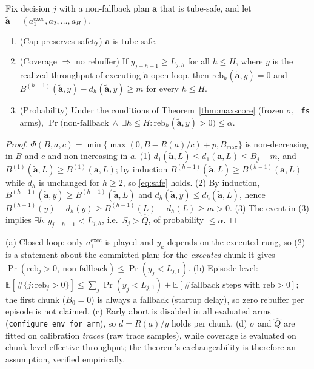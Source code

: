 \begin{lemma}\label{lem:safety}
Fix decision $j$ with a non-fallback plan $\mathbf a$ that is tube-safe, and let $\tilde{\mathbf a}=(a^{\mathrm{exec}}_1,a_2,\dots,a_H)$.
\begin{enumerate}
\item (Cap preserves safety) $\tilde{\mathbf a}$ is tube-safe.
\item (Coverage $\Rightarrow$ no rebuffer) If $y_{j+h-1}\ge L_{j,h}$ for all $h\le H$, where $y$ is the realized
 throughput of executing $\tilde{\mathbf a}$ open-loop, then $\mathrm{reb}_h(\tilde{\mathbf a},y)=0$ and
 $B^{(h-1)}(\tilde{\mathbf a},y)-d_h(\tilde{\mathbf a},y)\ge m$ for every $h\le H$.
\item (Probability) Under the conditions of Theorem~\ref{thm:maxscore} (frozen $\sigma$, \texttt{\_fs} arms),
 $\Pr\big(\text{non-fallback}\ \wedge\ \exists h\le H:\mathrm{reb}_h(\tilde{\mathbf a},y)>0\big)\le\alpha$.
\end{enumerate}
\end{lemma}
\begin{proof}
$\Phi(B,a,c)=\min\{\max(0,B-R(a)/c)+p,B_{\max}\}$ is non-decreasing in $B$ and $c$ and non-increasing in $a$.
(1) $d_1(\tilde{\mathbf a},L)\le d_1(\mathbf a,L)\le B_j-m$, and $B^{(1)}(\tilde{\mathbf a},L)\ge B^{(1)}(\mathbf a,L)$;
by induction $B^{(h-1)}(\tilde{\mathbf a},L)\ge B^{(h-1)}(\mathbf a,L)$ while $d_h$ is unchanged for $h\ge2$, so \eqref{eq:safe} holds.
(2) By induction, $B^{(h-1)}(\tilde{\mathbf a},y)\ge B^{(h-1)}(\tilde{\mathbf a},L)$ and $d_h(\tilde{\mathbf a},y)\le d_h(\tilde{\mathbf a},L)$,
hence $B^{(h-1)}(y)-d_h(y)\ge B^{(h-1)}(L)-d_h(L)\ge m>0$.
(3) The event in (3) implies $\exists h: y_{j+h-1}<L_{j,h}$, i.e.\ $S_j>\widehat Q$, of probability $\le\alpha$.
\end{proof}

\begin{remark}[Scope]
(a) Closed loop: only $a^{\mathrm{exec}}_1$ is played and $y_k$ depends on the executed rung, so (2) is a statement about the
committed plan; for the \emph{executed} chunk it gives $\Pr(\mathrm{reb}_j>0,\ \text{non-fallback})\le\Pr(y_j<L_{j,1})$.
(b) Episode level: $\mathbb E[\#\{j:\mathrm{reb}_j>0\}]\le\sum_j\Pr(y_j<L_{j,1})+\mathbb E[\#\text{fallback steps with }\mathrm{reb}>0]$;
the first chunk ($B_0=0$) is always a fallback (startup delay), so zero rebuffer per episode is not claimed.
(c) Early abort is disabled in all evaluated arms (\texttt{configure\_env\_for\_arm}), so $d=R(a)/y$ holds per chunk.
(d) $\sigma$ and $\widehat Q$ are fitted on calibration \emph{traces} (raw trace samples), while coverage is evaluated on
chunk-level effective throughput; the theorem's exchangeability is therefore an assumption, verified empirically.
\end{remark}
